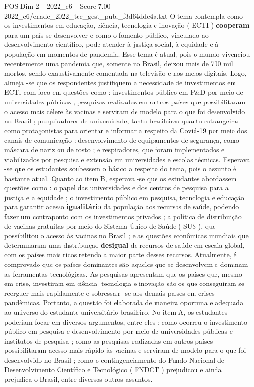 \begin{textsample}{POS Dim 2 – 2022\_c6 – Score 7.00 – 2022\_c6/enade\_2022\_tec\_gest\_publ\_f3d64ddc4a.txt}
O tema contempla como os investimentos em educação, ciência, tecnologia e inovação ( ECTI ) \textbf{cooperam} para um país se desenvolver e como o fomento público, vinculado ao desenvolvimento científico, pode atender à justiça social, à equidade e à população em momentos de pandemia.
Esse tema é atual, pois o mundo vivenciou recentemente uma pandemia que, somente no Brasil, deixou mais de 700 mil mortos, sendo exaustivamente comentada na televisão e nos meios digitais.
Logo, almeja -se que os respondentes justifiquem a necessidade de investimentos em ECTI com foco em questões como : investimentos público em P\&D por meio de universidades públicas ; pesquisas realizadas em outros países que possibilitaram o acesso mais célere às vacinas e serviram de modelo para o que foi desenvolvido no Brasil ; pesquisadores de universidade, tanto brasileiras quanto estrangeiras como protagonistas para orientar e informar a respeito da Covid-19 por meio dos canais de comunicação ; desenvolvimento de equipamentos de segurança, como máscara de nariz ou de rosto ; e respiradores, que foram implementados e viabilizados por pesquisa e extensão em universidades e escolas técnicas.
Esperava -se que os estudantes soubessem o básico a respeito do tema, pois o assunto é bastante atual.
Quanto ao item B, esperava -se que os estudantes abordassem questões como : o papel das universidades e dos centros de pesquisa para a justiça e a equidade ; o investimento público em pesquisa, tecnologia e educação para garantir acesso \textbf{igualitário} da população aos recursos de saúde, podendo fazer um contraponto com os investimentos privados ; a política de distribuição de vacinas gratuitas por meio do Sistema Único de Saúde ( SUS ), que possibilitou o acesso às vacinas no Brasil ; e as questões econômicas mundiais que determinaram uma distribuição \textbf{desigual} de recursos de saúde em escala global, com os países mais ricos retendo a maior parte desses recursos.
Atualmente, é comprovado que os países dominantes são aqueles que se desenvolvem e dominam as ferramentas tecnológicas.
As pesquisas apresentam que os países que, mesmo em crise, investiram em ciência, tecnologia e inovação são os que conseguiram se reerguer mais rapidamente e sobressair -se aos demais países em crises pandêmicas.
Portanto, a questão foi elaborada de maneira oportuna e adequada ao universo do estudante universitário brasileiro.
No item A, os estudantes poderiam focar em diversos argumentos, entre eles : como ocorreu o investimento público em pesquisa e desenvolvimento por meio de universidades públicas e institutos de pesquisa ; como as pesquisas realizadas em outros países possibilitaram acesso mais rápido às vacinas e serviram de modelo para o que foi desenvolvido no Brasil ; como o contingenciamento do Fundo Nacional de Desenvolvimento Científico e Tecnológico ( FNDCT ) prejudicou e ainda prejudica o Brasil, entre diversos outros assuntos.

\end{textsample}
